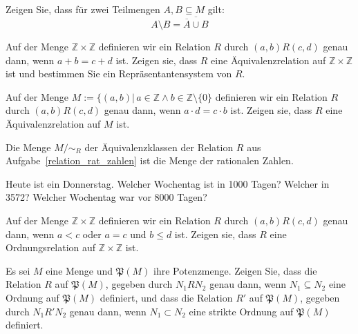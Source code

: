 \begin{aufgabe}\label{mengen_diff_komp} Zeigen Sie, dass für zwei Teilmengen $A, B \subseteq M$ gilt:
  	$$ A \setminus B = \overline{ \overline{A} \cup B} $$
\end{aufgabe}

\begin{aufgabe} Auf der Menge $\mathbb Z \times \mathbb Z$ definieren wir ein Relation $R$ durch 
$(a,b)R(c,d)$ genau dann, wenn $a+b = c+d$ ist. Zeigen sie, dass $R$ eine Äquivalenzrelation  
auf $\mathbb Z \times \mathbb Z$ ist und bestimmen Sie ein Repräsentantensystem von $R$. 
\end{aufgabe}

\begin{aufgabe}\label{relation_rat_zahlen} Auf der Menge $M := \{ (a,b) \vert \, a \in \mathbb Z 
\wedge b \in \mathbb Z \setminus \{ 0 \}$ definieren wir ein Relation $R$ durch 
$(a,b)R(c,d)$ genau dann, wenn $a \cdot d = c \cdot b$ ist. Zeigen sie, dass $R$ eine Äquivalenzrelation  
auf $M$ ist. 
\end{aufgabe}

\begin{notiz} Die Menge $M / \sim_R$ der Äquivalenzklassen der Relation $R$ aus Aufgabe~\ref{relation_rat_zahlen} 
ist die Menge der rationalen Zahlen.
\end{notiz}

\begin{aufgabe} Heute ist ein Donnerstag. Welcher Wochentag ist in 1000 Tagen? Welcher in 3572? Welcher 
Wochentag war vor 8000 Tagen?
\end{aufgabe}

\begin{aufgabe} Auf der Menge $\mathbb Z \times \mathbb Z$ definieren wir ein Relation $R$ durch 
$(a,b)R(c,d)$ genau dann, wenn $a < c$ oder $a = c$ und $b \leq d$ ist. Zeigen sie, dass $R$ 
eine Ordnungsrelation auf $\mathbb Z \times \mathbb Z$ ist.
\end{aufgabe}

\begin{aufgabe} Es sei $M$ eine Menge und $\mathfrak{P}(M)$ ihre Potenzmenge. Zeigen Sie, dass die 
Relation $R$ auf $\mathfrak{P}(M)$, gegeben durch $N_1 R N_2$ genau dann, wenn $N_1 \subseteq N_2$ eine 
Ordnung auf $\mathfrak{P}(M)$ definiert, und dass die Relation $R'$ auf $\mathfrak{P}(M)$, gegeben durch 
$N_1 R' N_2$ genau dann, wenn $N_1 \subset N_2$ eine strikte Ordnung auf $\mathfrak{P}(M)$ definiert.
\end{aufgabe}
  

